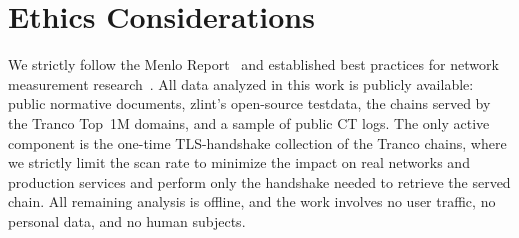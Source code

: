 \section*{Ethics Considerations}

We strictly follow the Menlo Report~\cite{kenneally2012menlo} and established best
practices for network measurement research~\cite{partridge2016ethical,allman2007issues}.
All data analyzed in this work is publicly available: public normative documents,
zlint's open-source testdata, the chains served by the Tranco Top~1M domains, and a
sample of public CT logs. The only active component is the
one-time TLS-handshake collection of the Tranco chains, where we strictly limit the
scan rate to minimize the impact on real networks and production services and perform
only the handshake needed to retrieve the served chain. All remaining analysis is
offline, and the work involves no user traffic, no personal data, and no human
subjects.
